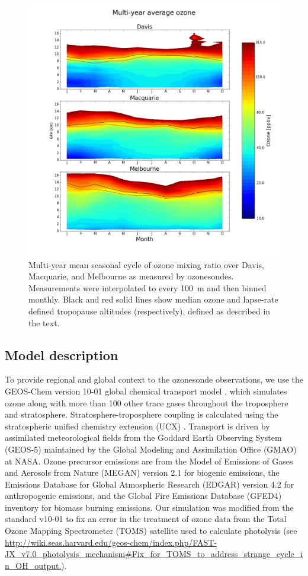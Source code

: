 \documentclass[acp, manuscript]{copernicus} %
\begin{document}
    \begin{figure}[t]
      \includegraphics[width=12.0cm]{figures/seasonaltropozone}
      \caption{ %
	Multi-year mean seasonal cycle of ozone mixing ratio over Davis, Macquarie, and Melbourne as measured by ozonesondes.
	Measurements were interpolated to every 100~m and then binned monthly.
	Black and red solid lines show median ozone and lapse-rate defined tropopause altitudes (respectively), defined as described in the text. }
      \label{fig:seasonaltropozone}
    \end{figure}

  \subsection{Model description}
    \label{sec:GEOSChemDescription}
    To provide regional and global context to the ozonesonde observations, we use the GEOS-Chem version 10-01 global chemical transport model \citep{Bey2001}, which simulates ozone along with more than 100 other trace gases throughout the troposphere and stratosphere. 
    Stratosphere-troposphere coupling is calculated using the stratospheric unified chemistry extension (UCX) \citep{Eastham2014}.
    Transport is driven by assimilated meteorological fields from the Goddard Earth Observing System (GEOS-5) maintained by the Global Modeling and Assimilation Office (GMAO) at NASA.
    Ozone precursor emissions are from the Model of Emissions of Gases and Aerosols from Nature (MEGAN) version 2.1 \citep{Guenther2012} for biogenic emissions, the Emissions Database for Global Atmospheric Research (EDGAR) version 4.2 for anthropogenic emissions, and the Global Fire Emissions Database (GFED4) inventory \citep{Giglio2013} for biomass burning emissions. 
    Our simulation was modified from the standard v10-01 to fix an error in the treatment of ozone data from the Total Ozone Mapping Spectrometer (TOMS) satellite used to calculate photolysis (see \url{http://wiki.seas.harvard.edu/geos-chem/index.php/FAST-JX_v7.0_photolysis_mechanism#Fix_for_TOMS_to_address_strange_cycle_in_OH_output.}).  
\end{document}
